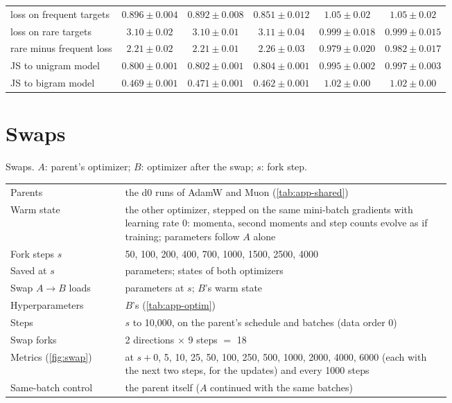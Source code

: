 \begin{center}
\begin{minipage}{\linewidth}
\begin{tabular}{@{}l|ccc|cc@{}}
loss on frequent targets & $0.896 \pm 0.004$ & $0.892 \pm 0.008$ & $0.851 \pm 0.012$ & $1.05 \pm 0.02$ & $1.05 \pm 0.02$ \\
loss on rare targets & $3.10 \pm 0.02$ & $3.10 \pm 0.01$ & $3.11 \pm 0.04$ & $0.999 \pm 0.018$ & $0.999 \pm 0.015$ \\
rare minus frequent loss & $2.21 \pm 0.02$ & $2.21 \pm 0.01$ & $2.26 \pm 0.03$ & $0.979 \pm 0.020$ & $0.982 \pm 0.017$ \\
JS to unigram model & $0.800 \pm 0.001$ & $0.802 \pm 0.001$ & $0.804 \pm 0.001$ & $0.995 \pm 0.002$ & $0.997 \pm 0.003$ \\
JS to bigram model & $0.469 \pm 0.001$ & $0.471 \pm 0.001$ & $0.462 \pm 0.001$ & $1.02 \pm 0.00$ & $1.02 \pm 0.00$ \\
\end{tabular}\end{minipage}
\end{center}

\section{Swaps}
\label{app:forks}

\begin{center}\small\begin{minipage}{\linewidth}\centering
\captionsetup{type=table}
\caption{Swaps. $A$: parent's optimizer; $B$: optimizer after the swap; $s$: fork step.}
\label{tab:app-forks}
\begin{tabular}{@{}lp{0.74\linewidth}@{}}
\hline
Parents & the d0 runs of AdamW and Muon (\cref{tab:app-shared}) \\
Warm state & the other optimizer, stepped on the same mini-batch gradients with learning rate 0: momenta, second
  moments and step counts evolve as if training; parameters follow $A$ alone \\
Fork steps $s$ & 50, 100, 200, 400, 700, 1000, 1500, 2500, 4000 \\
Saved at $s$ & parameters; states of both optimizers \\
\hline
Swap $A\to B$ loads & parameters at $s$; $B$'s warm state \\
Hyperparameters & $B$'s (\cref{tab:app-optim}) \\
Steps & $s$ to 10{,}000, on the parent's schedule and batches (data order 0) \\
Swap forks & 2 directions $\times$ 9 steps $=$ 18 \\
Metrics (\cref{fig:swap}) & at $s+{}$0, 5, 10, 25, 50, 100, 250, 500, 1000, 2000, 4000, 6000 (each with the next
  two steps, for the updates) and every 1000 steps \\
\hline
Same-batch control & the parent itself ($A$ continued with the same batches) \\
\hline
\end{tabular}\end{minipage}
\end{center}
